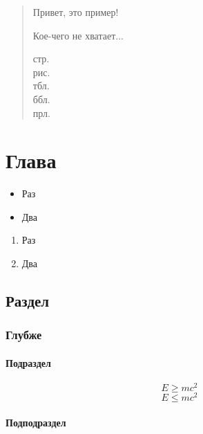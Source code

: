 \documentclass[12pt, rusmathsym]{nirreport}
\begin{document}
\titlepage

\begin{abstract}
  Привет, это пример!

  Кое-чего не хватает...

  стр. \totpag\\
  рис. \totfig\\
  тбл. \tottab\\
  ббл. \totbib\\
  прл. \totapp
\end{abstract}

\tableofcontents

\chapter{Глава}

\begin{itemize}
\item Раз
\item Два
\end{itemize}

\begin{enumerate}
\item Раз
\item Два
\end{enumerate}

\lipsum[1]

\section{Раздел}

\lipsum[1]

\subsection{Глубже}

\lipsum[1]

\subsubsection{Подраздел}

\lipsum[1]
\begin{equation}
  E \geq mc^2
\end{equation}
\begin{equation}
  E \leq mc^2
\end{equation}
\lipsum[1]

\subsubsection{Подподраздел}
\end{document}
